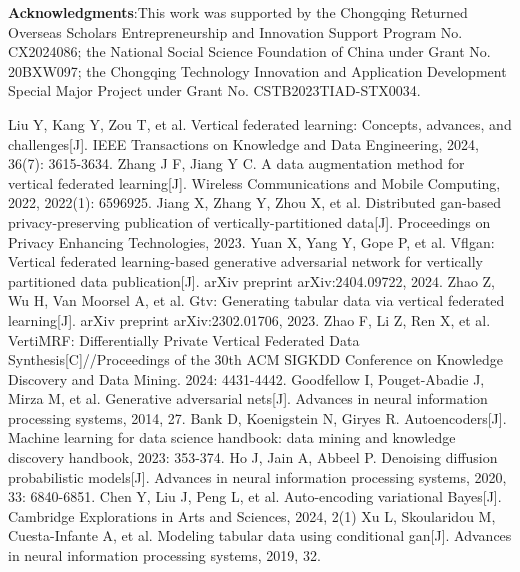 \documentclass[final,1p,times]{elsarticle}
\begin{document}
\textbf{Acknowledgments}:This work was supported by the Chongqing Returned Overseas Scholars Entrepreneurship and Innovation Support Program No. CX2024086; the National Social Science Foundation of China under Grant No. 20BXW097; the Chongqing Technology Innovation and Application Development Special Major Project under Grant No. CSTB2023TIAD-STX0034.




\begin{thebibliography}{00}


  Liu Y, Kang Y, Zou T, et al. Vertical federated learning: Concepts, advances, and challenges[J]. IEEE Transactions on Knowledge and Data Engineering, 2024, 36(7): 3615-3634.
Zhang J F, Jiang Y C. A data augmentation method for vertical federated learning[J]. Wireless Communications and Mobile Computing, 2022, 2022(1): 6596925.
Jiang X, Zhang Y, Zhou X, et al. Distributed gan-based privacy-preserving publication of vertically-partitioned data[J]. Proceedings on Privacy Enhancing Technologies, 2023.
Yuan X, Yang Y, Gope P, et al. Vflgan: Vertical federated learning-based generative adversarial network for vertically partitioned data publication[J]. arXiv preprint arXiv:2404.09722, 2024.
Zhao Z, Wu H, Van Moorsel A, et al. Gtv: Generating tabular data via vertical federated learning[J]. arXiv preprint arXiv:2302.01706, 2023.
Zhao F, Li Z, Ren X, et al. VertiMRF: Differentially Private Vertical Federated Data Synthesis[C]//Proceedings of the 30th ACM SIGKDD Conference on Knowledge Discovery and Data Mining. 2024: 4431-4442.
Goodfellow I, Pouget-Abadie J, Mirza M, et al. Generative adversarial nets[J]. Advances in neural information processing systems, 2014, 27.
Bank D, Koenigstein N, Giryes R. Autoencoders[J]. Machine learning for data science handbook: data mining and knowledge discovery handbook, 2023: 353-374.
Ho J, Jain A, Abbeel P. Denoising diffusion probabilistic models[J]. Advances in neural information processing systems, 2020, 33: 6840-6851.
Chen Y, Liu J, Peng L, et al. Auto-encoding variational Bayes[J]. Cambridge Explorations in Arts and Sciences, 2024, 2(1)
Xu L, Skoularidou M, Cuesta-Infante A, et al. Modeling tabular data using conditional gan[J]. Advances in neural information processing systems, 2019, 32.

\end{thebibliography}
\end{document}

